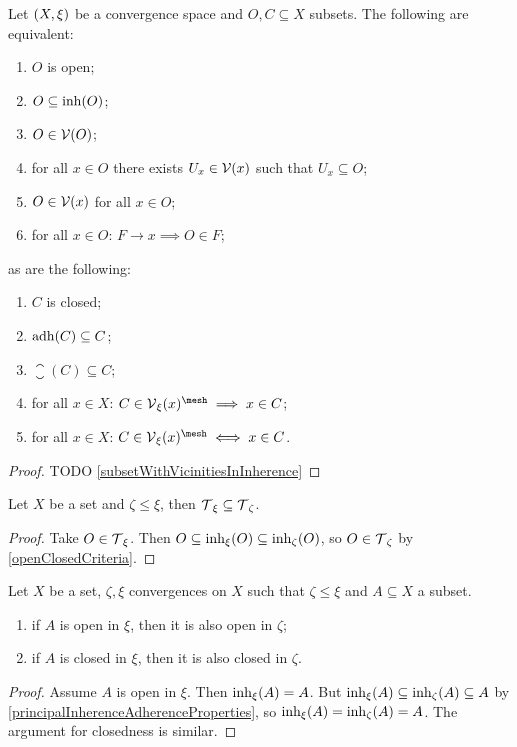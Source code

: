 \begin{lemma} \label{openClosedCriteria}
Let $\left( X,\xi \right)$ be a convergence space and $O,C\subseteq X$ subsets. The following are equivalent:
\begin{enumerate}
\item $O$ is open;
\item $O\subseteq \operatorname{inh}(O)$;
\item $O\in \operatorname{\mathcal{V}}(O)$;
\item for all $x\in O$ there exists $U_x\in \operatorname{\mathcal{V}}(x)$ such that $U_x\subseteq O$;
\item $O\in \operatorname{\mathcal{V}}(x)$ for all $x\in O$;
\item for all $x\in O$: $F\to x \implies O\in F$;
\end{enumerate}
as are the following:
\begin{enumerate}
\item $C$ is closed;
\item $\operatorname{adh}(C)\subseteq C$;
\item $\closure(C)\subseteq C$;
\item for all $x\in X$: $C\in \vicinity_\xi(x)^\mesh \implies x\in C$;
\item for all $x\in X$: $C\in \vicinity_\xi(x)^\mesh \iff x\in C$.
\end{enumerate}
\end{lemma}
\begin{proof}
TODO \ref{subsetWithVicinitiesInInherence}
\end{proof}

\begin{lemma} \label{topologyMonotoneInConvergence}
Let $X$ be a set and $\zeta \leq \xi$, then $\operatorname{\mathcal{T}}_{\xi} \subseteq \operatorname{\mathcal{T}}_{\zeta}$.
\end{lemma}
\begin{proof}
Take $O\in \operatorname{\mathcal{T}}_{\xi}$. Then $O\subseteq \operatorname{inh}_\xi(O) \subseteq \operatorname{inh}_\zeta(O)$, so $O\in \operatorname{\mathcal{T}}_\zeta$ by \ref{openClosedCriteria}.
\end{proof}

\begin{lemma} \label{openClosedConvergenceInclusions}
Let $X$ be a set, $\zeta, \xi$ convergences on $X$ such that $\zeta\leq\xi$ and $A\subseteq X$ a subset.
\begin{enumerate}
\item if $A$ is open in $\xi$, then it is also open in $\zeta$;
\item if $A$ is closed in $\xi$, then it is also closed in $\zeta$.
\end{enumerate}
\end{lemma}
\begin{proof}
Assume $A$ is open in $\xi$. Then $\operatorname{inh}_\xi(A) = A$. But $\operatorname{inh}_\xi(A) \subseteq \operatorname{inh}_\zeta(A) \subseteq A$ by \ref{principalInherenceAdherenceProperties}, so $\operatorname{inh}_\xi(A) = \operatorname{inh}_\zeta(A) = A$. The argument for closedness is similar.
\end{proof}

